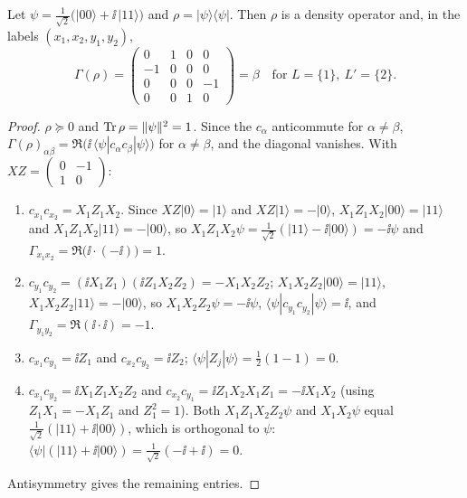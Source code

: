 \begin{theorem}\label{thm:bondstate}
Let $\psi=\tfrac1{\sqrt2}\bigl(|00\rangle+\ii\,|11\rangle\bigr)$ and $\rho=|\psi\rangle\langle\psi|$.
Then $\rho$ is a density operator and, in the labels $(x_1,x_2,y_1,y_2)$,
\[
 \Gamma(\rho)=\begin{pmatrix}0&1&0&0\\-1&0&0&0\\0&0&0&-1\\0&0&1&0\end{pmatrix}=\beta
 \quad\text{for }L=\{1\},\ L'=\{2\}.
\]
\end{theorem}
\begin{proof}
$\rho\succeq0$ and $\operatorname{Tr}\rho=\|\psi\|^2=1$. Since the $c_\alpha$ anticommute for
$\alpha\neq\beta$, $\Gamma(\rho)_{\alpha\beta}=\Re\bigl(\ii\,\langle\psi|c_\alpha c_\beta|\psi\rangle\bigr)$
for $\alpha\neq\beta$, and the diagonal vanishes. With $XZ=\begin{pmatrix}0&-1\\1&0\end{pmatrix}$:
\begin{enumerate}
\item[(a)] $c_{x_1}c_{x_2}=X_1Z_1X_2$. Since $XZ|0\rangle=|1\rangle$ and $XZ|1\rangle=-|0\rangle$,
 $X_1Z_1X_2|00\rangle=|11\rangle$ and $X_1Z_1X_2|11\rangle=-|00\rangle$, so
 $X_1Z_1X_2\psi=\tfrac1{\sqrt2}(|11\rangle-\ii|00\rangle)=-\ii\psi$ and
 $\Gamma_{x_1x_2}=\Re\bigl(\ii\cdot(-\ii)\bigr)=1$.
\item[(b)] $c_{y_1}c_{y_2}=(\ii X_1Z_1)(\ii Z_1X_2Z_2)=-X_1X_2Z_2$;
 $X_1X_2Z_2|00\rangle=|11\rangle$, $X_1X_2Z_2|11\rangle=-|00\rangle$, so
 $X_1X_2Z_2\psi=-\ii\psi$, $\langle\psi|c_{y_1}c_{y_2}|\psi\rangle=\ii$, and
 $\Gamma_{y_1y_2}=\Re(\ii\cdot\ii)=-1$.
\item[(c)] $c_{x_1}c_{y_1}=\ii Z_1$ and $c_{x_2}c_{y_2}=\ii Z_2$; $\langle\psi|Z_j|\psi\rangle=\tfrac12(1-1)=0$.
\item[(d)] $c_{x_1}c_{y_2}=\ii X_1Z_1X_2Z_2$ and $c_{x_2}c_{y_1}=\ii Z_1X_2X_1Z_1=-\ii X_1X_2$
 (using $Z_1X_1=-X_1Z_1$ and $Z_1^2=1$). Both $X_1Z_1X_2Z_2\psi$ and $X_1X_2\psi$ equal
 $\tfrac1{\sqrt2}(|11\rangle+\ii|00\rangle)$, which is orthogonal to $\psi$:
 $\langle\psi|(|11\rangle+\ii|00\rangle)=\tfrac1{\sqrt2}(-\ii+\ii)=0$.
\end{enumerate}
Antisymmetry gives the remaining entries.
\end{proof}
